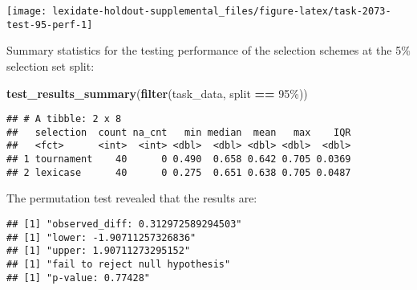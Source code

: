 \documentclass[
]{book}
\newenvironment{Shaded}{\begin{snugshade}}{\end{snugshade}}
\newcommand{\AttributeTok}[1]{\textcolor[rgb]{0.13,0.29,0.53}{#1}}
\newcommand{\DecValTok}[1]{\textcolor[rgb]{0.00,0.00,0.81}{#1}}
\newcommand{\FunctionTok}[1]{\textcolor[rgb]{0.13,0.29,0.53}{\textbf{#1}}}
\newcommand{\NormalTok}[1]{#1}
\newcommand{\OtherTok}[1]{\textcolor[rgb]{0.56,0.35,0.01}{#1}}
\newcommand{\SpecialCharTok}[1]{\textcolor[rgb]{0.81,0.36,0.00}{\textbf{#1}}}
\newcommand{\StringTok}[1]{\textcolor[rgb]{0.31,0.60,0.02}{#1}}
\begin{document}
\texttt{[image: lexidate-holdout-supplemental\_files/figure-latex/task-2073-test-95-perf-1]}

Summary statistics for the testing performance of the selection schemes at the 5\% selection set split:

\begin{Shaded}
\begin{Highlighting}[]
\FunctionTok{test\_results\_summary}\NormalTok{(}\FunctionTok{filter}\NormalTok{(task\_data, split }\SpecialCharTok{==} \StringTok{\textquotesingle{}95\%\textquotesingle{}}\NormalTok{))}
\end{Highlighting}
\end{Shaded}

\begin{verbatim}
## # A tibble: 2 x 8
##   selection  count na_cnt   min median  mean   max    IQR
##   <fct>      <int>  <int> <dbl>  <dbl> <dbl> <dbl>  <dbl>
## 1 tournament    40      0 0.490  0.658 0.642 0.705 0.0369
## 2 lexicase      40      0 0.275  0.651 0.638 0.705 0.0487
\end{verbatim}

The permutation test revealed that the results are:

\begin{Shaded}
\end{Shaded}

\begin{verbatim}
## [1] "observed_diff: 0.312972589294503"
## [1] "lower: -1.90711257326836"
## [1] "upper: 1.90711273295152"
## [1] "fail to reject null hypothesis"
## [1] "p-value: 0.77428"
\end{verbatim}
\end{document}
